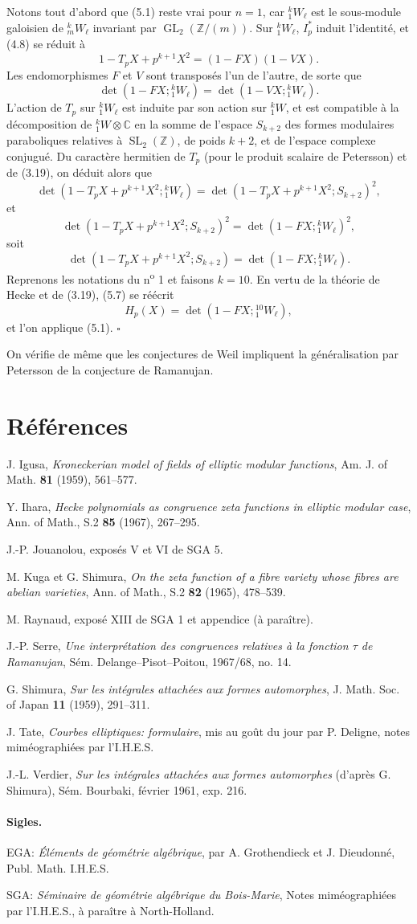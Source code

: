 \documentclass[10pt]{article}
\newcommand{\C}{\mathbb C}
\newcommand{\Z}{\mathbb Z}
\newcommand{\GL}{\operatorname{GL}}
\newcommand{\SL}{\operatorname{SL}}
\newcommand{\QED}{\hfill$\square$}
\begin{document}
Notons tout d'abord que (5.1) reste vrai pour $n=1$, car ${}^k_1W_\ell$ est le sous-module galoisien de ${}^k_mW_\ell$ invariant par $\GL_2(\Z/(m))$. Sur ${}^k_1W_\ell$, $I_p^*$ induit l'identité, et (4.8) se réduit à
\[
1-T_pX+p^{k+1}X^2=(1-FX)(1-VX).
\]
Les endomorphismes $F$ et $V$ sont transposés l'un de l'autre, de sorte que
\[
\det(1-FX;{}^k_1W_\ell)=\det(1-VX;{}^k_1W_\ell).
\]
L'action de $T_p$ sur ${}^k_1W_\ell$ est induite par son action sur ${}^k_1W$, et est compatible à la décomposition de ${}^k_1W\otimes\C$ en la somme de l'espace $S_{k+2}$ des formes modulaires paraboliques relatives à $\SL_2(\Z)$, de poids $k+2$, et de l'espace complexe conjugué. Du caractère hermitien de $T_p$ (pour le produit scalaire de Petersson) et de (3.19), on déduit alors que
\[
\det(1-T_pX+p^{k+1}X^2;{}^k_1W_\ell)=\det(1-T_pX+p^{k+1}X^2;S_{k+2})^2,
\]
et
\[
\det(1-T_pX+p^{k+1}X^2;S_{k+2})^2=\det(1-FX;{}^k_1W_\ell)^2,
\]
soit
\[
\det(1-T_pX+p^{k+1}X^2;S_{k+2})=\det(1-FX;{}^k_1W_\ell).
\tag{5.7}
\]
Reprenons les notations du n\textsuperscript{o} 1 et faisons $k=10$. En vertu de la théorie de Hecke et de (3.19), (5.7) se réécrit
\[
H_p(X)=\det(1-FX;{}^{10}_1W_\ell),
\]
et l'on applique (5.1). \QED

On vérifie de même que les conjectures de Weil impliquent la généralisation par Petersson de la conjecture de Ramanujan.

\section*{Références}
\begin{enumerate}[label={[\arabic*]},leftmargin=2.6em]
\item J. Igusa, \emph{Kroneckerian model of fields of elliptic modular functions}, Am. J. of Math. \textbf{81} (1959), 561--577.
\item Y. Ihara, \emph{Hecke polynomials as congruence zeta functions in elliptic modular case}, Ann. of Math., S.2 \textbf{85} (1967), 267--295.
\item J.-P. Jouanolou, exposés V et VI de SGA 5.
\item M. Kuga et G. Shimura, \emph{On the zeta function of a fibre variety whose fibres are abelian varieties}, Ann. of Math., S.2 \textbf{82} (1965), 478--539.
\item M. Raynaud, exposé XIII de SGA 1 et appendice (à paraître).
\item J.-P. Serre, \emph{Une interprétation des congruences relatives à la fonction $\tau$ de Ramanujan}, Sém. Delange--Pisot--Poitou, 1967/68, no. 14.
\item G. Shimura, \emph{Sur les intégrales attachées aux formes automorphes}, J. Math. Soc. of Japan \textbf{11} (1959), 291--311.
\item J. Tate, \emph{Courbes elliptiques: formulaire}, mis au goût du jour par P. Deligne, notes miméographiées par l'I.H.E.S.
\item J.-L. Verdier, \emph{Sur les intégrales attachées aux formes automorphes} (d'après G. Shimura), Sém. Bourbaki, février 1961, exp. 216.
\end{enumerate}

\paragraph{Sigles.}
EGA: \emph{Éléments de géométrie algébrique}, par A. Grothendieck et J. Dieudonné, Publ. Math. I.H.E.S.

SGA: \emph{Séminaire de géométrie algébrique du Bois-Marie}, Notes miméographiées par l'I.H.E.S., à paraître à North-Holland.
\end{document}
